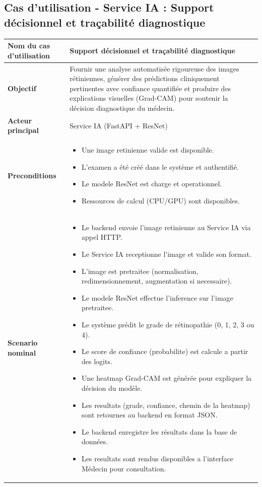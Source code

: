 \subsection{Cas d'utilisation - Service IA : Support décisionnel et traçabilité diagnostique}
\begin{table}[H]
\centering
\renewcommand{\arraystretch}{1.3}
\begin{tabular}{|p{5cm}|p{10cm}|}
\hline
\textbf{Nom du cas d'utilisation} & Support décisionnel et traçabilité diagnostique \\ \hline

\textbf{Objectif} & Fournir une analyse automatisée rigoureuse des images rétiniennes, générer des prédictions cliniquement pertinentes avec confiance quantifiée et produire des explications visuelles (Grad-CAM) pour soutenir la décision diagnostique du médecin. \\ \hline

\textbf{Acteur principal} & Service IA (FastAPI + ResNet) \\ \hline

\textbf{Preconditions} &
\begin{itemize}
\item Une image retinienne valide  est disponible.
\item L'examen a été créé dans le système et authentifié.
\item Le modele ResNet est charge et operationnel.
\item Ressources de calcul (CPU/GPU) sont disponibles.
\end{itemize} \\ \hline

\textbf{Scenario nominal} &
\begin{itemize}
\item Le backend envoie l'image retinienne au Service IA via appel HTTP.
\item Le Service IA receptionne l'image et valide son format.
\item L'image est pretraitee (normalisation, redimensionnement, augmentation si necessaire).
\item Le modele ResNet effectue l'inference sur l'image pretraitee.
\item Le système prédit le grade de rétinopathie (0, 1, 2, 3 ou 4).
\item Le score de confiance (probabilite) est calcule a partir des logits.
\item Une heatmap Grad-CAM est générée pour expliquer la décision du modèle.
\item Les resultats (grade, confiance, chemin de la heatmap) sont retournes au backend en format JSON.
\item Le backend enregistre les résultats dans la base de données.
\item Les resultats sont rendus disponibles a l'interface Médecin pour consultation.
\end{itemize} \\ \hline


\end{tabular}
\end{table}
